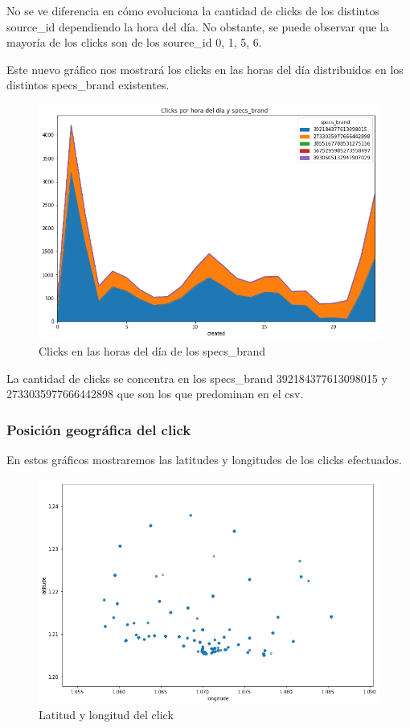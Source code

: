 \documentclass[a4paper, 12pt]{article}
\begin{document}
	
		 No se ve diferencia en cómo evoluciona la cantidad de clicks de los distintos source\_id dependiendo la hora del día. No obstante, se puede observar que la mayoría de los clicks son de los source\_id 0, 1, 5, 6.

		\clearpage
		 Este nuevo gráfico nos mostrará los clicks en las horas del día distribuidos en los distintos specs\_brand existentes.

		\FloatBarrier
		\begin{figure}[h]
			\centering
			\includegraphics[width=\textwidth]{images/clicks/clicks_specs_brand_hours.png}
			\caption{Clicks en las horas del día de los specs\_brand}
		\end{figure}
		\FloatBarrier

		 La cantidad de clicks se concentra en los specs\_brand 392184377613098015 y 2733035977666442898 que son los que predominan en el csv.
	
	\clearpage
	\subsubsection{Posición geográfica del click}
		
		 En estos gráficos mostraremos las latitudes y longitudes de los clicks efectuados.

		\FloatBarrier
		\begin{figure}[h]
			\centering
			\includegraphics[scale=0.48]{images/clicks/clicks_lat_long_scatter.png}
			\caption{Latitud y longitud del click}
		\end{figure}
		\FloatBarrier
\end{document}
